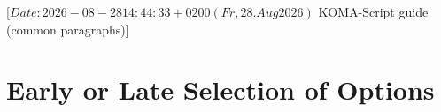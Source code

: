 %
%
%
%
%
%
%

                 [$Date: 2026-08-28 14:44:33 +0200 (Fr, 28. Aug 2026) $
                  KOMA-Script guide (common paragraphs)]

\section{Early or Late Selection of Options}
\BeginIndexGroup
{}%

